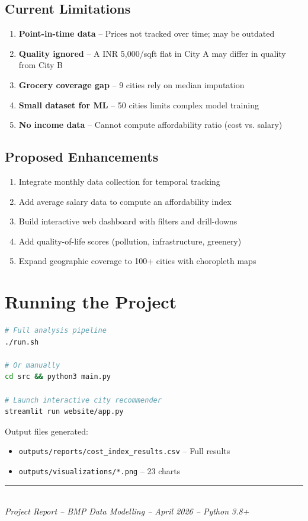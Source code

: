 \documentclass[12pt,a4paper]{article}
\begin{document}
\subsection{Current Limitations}
\begin{enumerate}
  \item \textbf{Point-in-time data} -- Prices not tracked over time; may be outdated
  \item \textbf{Quality ignored} -- A INR 5,000/sqft flat in City A may differ in quality from City B
  \item \textbf{Grocery coverage gap} -- 9 cities rely on median imputation
  \item \textbf{Small dataset for ML} -- 50 cities limits complex model training
  \item \textbf{No income data} -- Cannot compute affordability ratio (cost vs. salary)
\end{enumerate}

\subsection{Proposed Enhancements}
\begin{enumerate}
  \item Integrate monthly data collection for temporal tracking
  \item Add average salary data to compute an affordability index
  \item Build interactive web dashboard with filters and drill-downs
  \item Add quality-of-life scores (pollution, infrastructure, greenery)
  \item Expand geographic coverage to 100+ cities with choropleth maps
\end{enumerate}

\section*{Running the Project}

\begin{lstlisting}[language=bash]
# Full analysis pipeline
./run.sh

# Or manually
cd src && python3 main.py

# Launch interactive city recommender
streamlit run website/app.py
\end{lstlisting}

Output files generated:
\begin{itemize}
  \item \texttt{outputs/reports/cost\_index\_results.csv} -- Full results
  \item \texttt{outputs/visualizations/*.png} -- 23 charts
\end{itemize}

\vfill
\noindent\rule{\linewidth}{0.4pt}\\
\textit{Project Report -- BMP Data Modelling -- April 2026 -- Python 3.8+}
\end{document}
